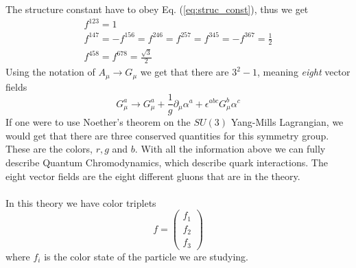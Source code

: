 \documentclass[12pt, a4paper]{book}
\begin{document}
The structure constant have to obey Eq. (\ref{eq:struc_const}), thus we get 
\begin{align*}
    f^{123}=1\\
    f^{147}=-f^{156}=f^{246}=f^{257}=f^{345}=-f^{367}={\frac{1}{2}}\\
    f^{458}=f^{678}={\frac {\sqrt {3}}{2}}
\end{align*}
Using the notation of $A_\mu\rightarrow G_\mu$ we get that there are $3^2-1$, meaning \textit{eight} vector fields 
$$
G_\mu^a \rightarrow G^a_\mu +\frac{1}{g}\partial_\mu\alpha^a +\epsilon^{abc}G_\mu^b\alpha^c
$$
If one were to use Noether's theorem on the $SU(3)$ Yang-Mills Lagrangian, we would get that there are three conserved quantities for this symmetry group. These are the colors, $r,g$ and $b$. With all the information above we can 
fully describe Quantum Chromodynamics, which describe quark interactions. The eight vector fields are the eight different gluons that are in the theory.\\
\\In this theory we have color triplets
$$
f=\begin{pmatrix}
    f_1\\f_2\\f_3
\end{pmatrix}
$$
where $f_i$ is the color state of the particle we are studying.
\end{document}
